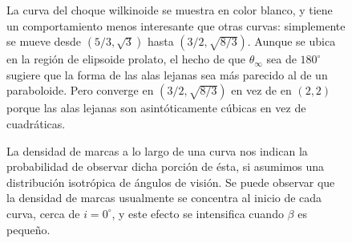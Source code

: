 \begin{figure}
La curva del choque wilkinoide se muestra en color blanco, y tiene un comportamiento menos interesante que otras curvas: simplemente se mueve desde $(5/3, \sqrt{3})$ hasta $(3/2, \sqrt{8/3})$. Aunque se ubica en la región de elipsoide prolato, el hecho de que $\theta_\infty$ sea de $180^\circ$ sugiere que la forma de las alas lejanas sea más parecido al de un paraboloide. Pero converge en $(3/2, \sqrt{8/3})$ en vez de en $(2, 2)$ porque las alas lejanas son asintóticamente cúbicas en vez de cuadráticas.

La densidad de marcas a lo largo de una curva nos indican la probabilidad de observar dicha porción de ésta, si asumimos una distribución isotrópica de ángulos de visión. Se puede observar que la densidad de marcas usualmente se concentra al inicio de cada curva, cerca de $i=0^\circ$, y este efecto se intensifica cuando $\beta$ es pequeño.


\end{figure}
